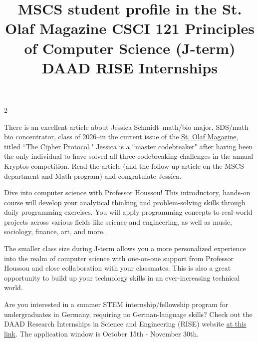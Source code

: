 \documentclass[12pt]{article}
\newcommand{\bolder}{\textbf}
\begin{document}
\begin{multicols}{2}
\begin{tcolorbox}[colback=white, colframe=black]
    \begin{center}
    \title{{\large \bolder{MSCS student profile in the St. Olaf Magazine
}}}
    \end{center}
\end{tcolorbox}

There is an excellent article about Jessica Schmidt--math/bio major, SDS/math bio concentrator, class of 2026--in the current issue of the \href{https://wp.stolaf.edu/magazine/}{St. Olaf Magazine}, titled ``The Cipher Protocol." Jessica is a ``master codebreaker" after having been the only individual to have solved all three codebreaking challenges in the annual Kryptos competition. Read the article (and the follow-up article on the MSCS department and Math program) and congratulate Jessica.

\begin{tcolorbox}[colback=white, colframe=black]
    \begin{center}
    \title{{\large \bolder{CSCI 121 Principles of Computer Science (J-term)
}}}
    \end{center}
\end{tcolorbox}

Dive into computer science with Professor Houssou! This introductory, hands-on course will develop your analytical thinking and problem-solving skills through daily programming exercises. You will apply programming concepts to real-world projects across various fields like science and engineering, as well as music, sociology, finance, art, and more. 

The smaller class size during J-term allows you a more personalized experience into the realm of computer science with one-on-one support from Professor Houssou and close collaboration with your classmates. This is also a great opportunity to build up your technology skills in an ever-increasing technical world.

\begin{tcolorbox}[colback=white, colframe=black]
    \begin{center}
    \title{{\large \bolder{DAAD RISE Internships}}}
    \end{center}
\end{tcolorbox}

Are you interested in a summer STEM internship/fellowship program for undergraduates in Germany, requiring no German-language skills? Check out the DAAD Research Internships in Science and Engineering (RISE) website \href{https://www.daad.de/rise/en/}{at this link}. The application window is October 15th - November 30th.



\end{multicols}
\end{document}
